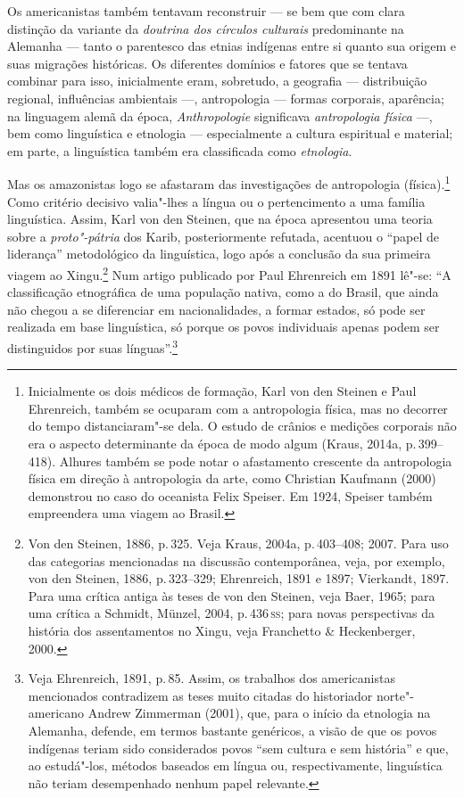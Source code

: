 Os americanistas também tentavam reconstruir --- se bem que com clara
distinção da variante da \textit{doutrina dos círculos culturais} predominante na
Alemanha --- tanto o parentesco das etnias indígenas entre si quanto sua
origem e suas migrações históricas. Os diferentes domínios e fatores que
se tentava combinar para isso, inicialmente eram, sobretudo, a
geografia --- distribuição regional, influências ambientais ---, antropologia --- formas corporais, aparência; na linguagem alemã da época,
\textit{Anthropologie} significava \textit{antropologia física} ---,
bem como linguística e etnologia --- especialmente a
cultura espiritual e material; em parte, a linguística também era
classificada como \textit{etnologia}.

Mas os amazonistas logo se afastaram das investigações de antropologia
(física).\footnote{Inicialmente os dois médicos de formação, Karl von
  den Steinen e Paul Ehrenreich, também se ocuparam com a antropologia
  física, mas no decorrer do tempo distanciaram"-se dela. O estudo de
  crânios e medições corporais não era o aspecto determinante da época
  de modo algum (Kraus, 2014a, p.\,399--418). Alhures também se pode notar
  o afastamento crescente da antropologia física em direção à
  antropologia da arte, como Christian Kaufmann (2000) demonstrou no
  caso do oceanista Felix Speiser. Em 1924, Speiser também
  empreendera uma viagem ao Brasil.} Como critério decisivo valia"-lhes a
língua ou o pertencimento a uma família linguística. Assim, Karl von den
Steinen, que na época apresentou uma teoria sobre a \textit{proto"-pátria} dos Karib, posteriormente refutada, acentuou o
``papel de liderança'' metodológico da linguística, logo após a
conclusão da sua primeira viagem ao Xingu.\footnote{Von den Steinen,
  1886, p.\,325. Veja Kraus, 2004a, p.\,403--408; 2007. Para uso das
  categorias mencionadas na discussão contemporânea, veja, por exemplo,
  von den Steinen, 1886, p.\,323--329; Ehrenreich, 1891 e 1897; Vierkandt,
  1897. Para uma crítica antiga às teses de von den Steinen, veja Baer,
  1965; para uma crítica a Schmidt, Münzel, 2004, p.\,436\,\textsc{ss}; para
  novas perspectivas da história dos assentamentos no Xingu, veja
  Franchetto \& Heckenberger, 2000.} Num artigo publicado por Paul
Ehrenreich em 1891 lê"-se: ``A classificação etnográfica de uma população
nativa, como a do Brasil, que ainda não chegou a se diferenciar em
nacionalidades, a formar estados, só pode ser realizada em base
linguística, só porque os povos individuais apenas podem ser
distinguidos por suas línguas''.\footnote{Veja Ehrenreich, 1891, p.\,85. Assim,
  os trabalhos dos americanistas mencionados contradizem as teses muito
  citadas do historiador norte"-americano Andrew Zimmerman (2001), que,
  para o início da etnologia na Alemanha, defende, em termos bastante
  genéricos, a visão de que os povos indígenas teriam sido considerados
  povos ``sem cultura e sem história'' e que, ao estudá"-los, métodos
  baseados em língua ou, respectivamente, linguística não teriam
  desempenhado nenhum papel relevante.}

